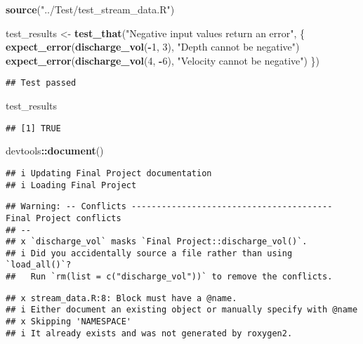 \documentclass[
]{article}
\newenvironment{Shaded}{\begin{snugshade}}{\end{snugshade}}
\newcommand{\DecValTok}[1]{\textcolor[rgb]{0.00,0.00,0.81}{#1}}
\newcommand{\FunctionTok}[1]{\textcolor[rgb]{0.13,0.29,0.53}{\textbf{#1}}}
\newcommand{\NormalTok}[1]{#1}
\newcommand{\OtherTok}[1]{\textcolor[rgb]{0.56,0.35,0.01}{#1}}
\newcommand{\SpecialCharTok}[1]{\textcolor[rgb]{0.81,0.36,0.00}{\textbf{#1}}}
\newcommand{\StringTok}[1]{\textcolor[rgb]{0.31,0.60,0.02}{#1}}
\begin{document}
\begin{Shaded}
\begin{Highlighting}[]
\FunctionTok{source}\NormalTok{(}\StringTok{"../Test/test\_stream\_data.R"}\NormalTok{)}

\NormalTok{test\_results }\OtherTok{\textless{}{-}} \FunctionTok{test\_that}\NormalTok{(}\StringTok{"Negative input values return an error"}\NormalTok{, \{}
  \FunctionTok{expect\_error}\NormalTok{(}\FunctionTok{discharge\_vol}\NormalTok{(}\SpecialCharTok{{-}}\DecValTok{1}\NormalTok{, }\DecValTok{3}\NormalTok{), }\StringTok{"Depth cannot be negative"}\NormalTok{)}
  \FunctionTok{expect\_error}\NormalTok{(}\FunctionTok{discharge\_vol}\NormalTok{(}\DecValTok{4}\NormalTok{, }\SpecialCharTok{{-}}\DecValTok{6}\NormalTok{), }\StringTok{"Velocity cannot be negative"}\NormalTok{)}
\NormalTok{\})}
\end{Highlighting}
\end{Shaded}

\begin{verbatim}
## Test passed
\end{verbatim}

\begin{Shaded}
\begin{Highlighting}[]
\NormalTok{test\_results}
\end{Highlighting}
\end{Shaded}

\begin{verbatim}
## [1] TRUE
\end{verbatim}

\begin{Shaded}
\begin{Highlighting}[]
\NormalTok{devtools}\SpecialCharTok{::}\FunctionTok{document}\NormalTok{()}
\end{Highlighting}
\end{Shaded}

\begin{verbatim}
## i Updating Final Project documentation
## i Loading Final Project
\end{verbatim}

\begin{verbatim}
## Warning: -- Conflicts ---------------------------------------- Final Project conflicts
## --
## x `discharge_vol` masks `Final Project::discharge_vol()`.
## i Did you accidentally source a file rather than using `load_all()`?
##   Run `rm(list = c("discharge_vol"))` to remove the conflicts.
\end{verbatim}

\begin{verbatim}
## x stream_data.R:8: Block must have a @name.
## i Either document an existing object or manually specify with @name
## x Skipping 'NAMESPACE'
## i It already exists and was not generated by roxygen2.
\end{verbatim}
\end{document}
